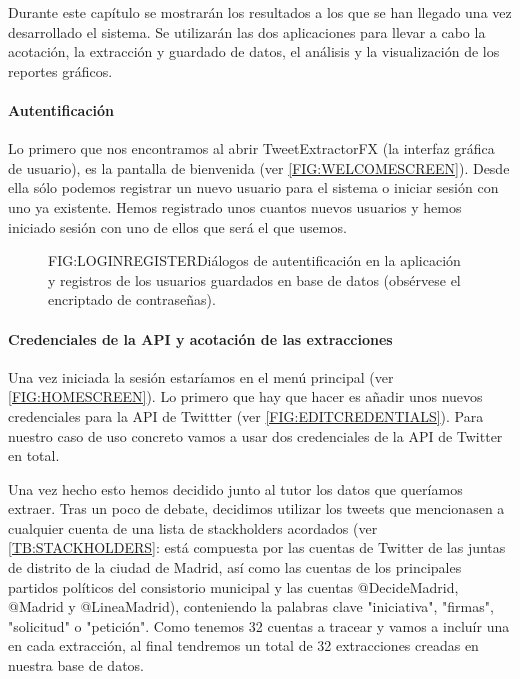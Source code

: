Durante este capítulo se mostrarán los resultados a los que se han llegado una vez desarrollado el sistema. Se utilizarán las dos aplicaciones para llevar a cabo la acotación, la extracción y guardado de datos, el análisis y la visualización de los reportes gráficos. 

\paragraph{Autentificación}
Lo primero que nos encontramos al abrir TweetExtractorFX (la interfaz gráfica de usuario), es la pantalla de bienvenida (ver \ref{FIG:WELCOMESCREEN}). Desde ella sólo podemos registrar un nuevo usuario para el sistema o iniciar sesión con uno ya existente. Hemos registrado unos cuantos nuevos usuarios y hemos iniciado sesión con uno de ellos que será el que usemos.

\begin{figure}[Registro e inicio de sesión]{FIG:LOGINREGISTER}{Diálogos de autentificación en la aplicación y registros de los usuarios guardados en base de datos (obsérvese el encriptado de contraseñas).}
	 \quad
\end{figure}

\paragraph{Credenciales de la API y acotación de las extracciones}
Una vez iniciada la sesión estaríamos en el menú principal (ver \ref{FIG:HOMESCREEN}). Lo primero que hay que hacer es añadir unos nuevos credenciales para la API de Twittter (ver \ref{FIG:EDITCREDENTIALS}). Para nuestro caso de uso concreto vamos a usar dos credenciales de la API de Twitter en total.

Una vez hecho esto hemos decidido junto al tutor los datos que queríamos extraer. Tras un poco de debate, decidimos utilizar los tweets que mencionasen a cualquier cuenta de una lista de stackholders acordados (ver \ref{TB:STACKHOLDERS}: está compuesta por las cuentas de Twitter de las juntas de distrito de la ciudad de Madrid, así como las cuentas de los principales partidos políticos del consistorio municipal y las cuentas @DecideMadrid, @Madrid y @LineaMadrid), conteniendo la palabras clave "iniciativa", "firmas", "solicitud" o "petición". Como tenemos 32 cuentas a tracear y vamos a incluír una en cada extracción, al final tendremos un total de 32 extracciones creadas en nuestra base de datos.

